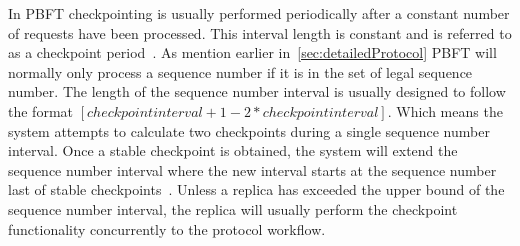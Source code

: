 In PBFT checkpointing is usually performed periodically after a constant number of requests have been processed. This interval length is constant and is referred to as a checkpoint period~\cites[p.~261]{BOOK:BuildDepDistSyst}[p.~410]{PAPER:PBFTRecovery}. As mention earlier in~\autoref{sec:detailedProtocol} PBFT will normally only process a sequence number if it is in the set of legal sequence number. The length of the sequence number interval is usually designed to follow the format $[checkpointinterval+1-2*checkpointinterval]$. Which means the system attempts to calculate two checkpoints during a single sequence number interval. Once a stable checkpoint is obtained, the system will extend the sequence number interval where the new interval starts at the sequence number last of stable checkpoints~\cites[p.~5]{PAPER:OGPBFT}[p.~410]{PAPER:PBFTRecovery}. Unless a replica has exceeded the upper bound of the sequence number interval, the replica will usually perform the checkpoint functionality concurrently to the protocol workflow.

\iffalse
\cite[p.~261-262]{BOOK:BuildDepDistSyst}
\cite[p.~5]{PAPER:OGPBFT}
\cites[p.~3]{PAPER:DPBFT}
\cite[p.~409-410]{PAPER:PBFTRecovery}
\fi


